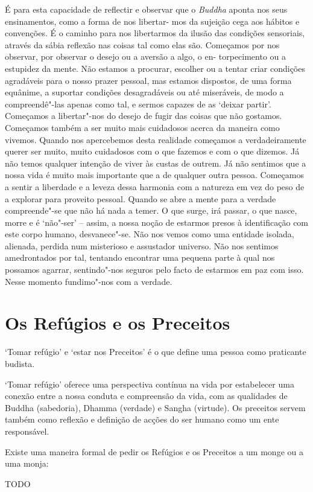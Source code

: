 É para esta capacidade de reflectir e observar que o \emph{Buddha}
aponta nos seus ensinamentos, como a forma de nos libertar- mos da
sujeição cega aos hábitos e convenções. É o caminho para nos libertarmos
da ilusão das condições sensoriais, através da sábia reflexão nas coisas
tal como elas são. Começamos por nos observar, por observar o desejo ou
a aversão a algo, o en- torpecimento ou a estupidez da mente. Não
estamos a procurar, escolher ou a tentar criar condições agradáveis para
o nosso prazer pessoal, mas estamos dispostos, de uma forma equânime,
a suportar condições desagradáveis ou até miseráveis, de modo a
compreendê"-las apenas como tal, e sermos capazes de as `deixar partir'.
Começamos a libertar"-nos do desejo de fugir das coisas que não gostamos.
Começamos também a ser muito mais cuidadosos acerca da maneira como
vivemos. Quando nos apercebemos desta realidade começamos a
verdadeiramente querer ser muito, muito cuidadosos com o que fazemos e
com o que dizemos. Já não temos qualquer intenção de viver às custas de
outrem. Já não sentimos que a nossa vida é muito mais importante que a
de qualquer outra pessoa. Começamos a sentir a liberdade e a leveza
dessa harmonia com a natureza em vez do peso de a explorar para proveito
pessoal. Quando se abre a mente para a verdade compreende"-se que não há
nada a temer. O que surge, irá passar, o que nasce, morre e é `não"-ser'
-- assim, a nossa noção de estarmos presos à identificação com este
corpo humano, desvanece"-se. Não nos vemos como uma entidade isolada,
alienada, perdida num misterioso e assustador universo. Não nos sentimos
amedrontados por tal, tentando encontrar uma pequena parte à qual nos
possamos agarrar, sentindo"-nos seguros pelo facto de estarmos em paz com
isso. Nesse momento fundimo"-nos com a verdade.

\chapter{Os Refúgios e os Preceitos}

`Tomar refúgio' e `estar nos Preceitos' é o que define uma
pessoa como praticante budista.

`Tomar refúgio' oferece uma perspectiva contínua na vida por estabelecer
uma conexão entre a nossa conduta e compreensão da vida, com as
qualidades de Buddha (sabedoria), Dhamma (verdade) e Sangha (virtude).
Os preceitos servem também como reflexão e definição de acções do ser
humano como um ente responsável.

Existe uma maneira formal de pedir os Refúgios e os Preceitos a um monge
ou a uma monja:

TODO

